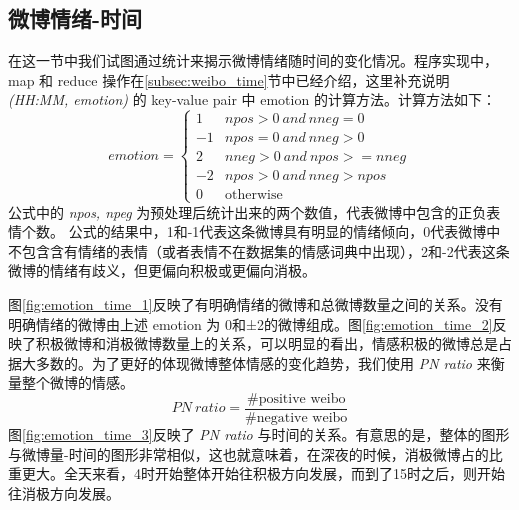 \documentclass[12pt, oneside]{article}
\begin{document}
\begin{spacing}{1.5}
\begin{CJK}{UTF8}{gbsn}
\subsection{微博情绪-时间}
\label{subsec:emotion_time}
在这一节中我们试图通过统计来揭示微博情绪随时间的变化情况。程序实现中， map 和 reduce 操作在\ref{subsec:weibo_time}节中已经介绍，这里补充说明 {\it(HH:MM, emotion)} 的 key-value pair 中 emotion 的计算方法。计算方法如下：
$$
emotion = 
\begin{cases}
1 & npos > 0~and~nneg = 0 \\
-1 & npos = 0~and~nneg > 0 \\
2 & nneg > 0~and~npos >= nneg \\
-2 & npos > 0~and~nneg > npos \\
0 & \text{otherwise}
\end{cases}
$$
公式中的 {\it npos, npeg} 为预处理后统计出来的两个数值，代表微博中包含的正负表情个数。 公式的结果中，1和-1代表这条微博具有明显的情绪倾向，0代表微博中不包含含有情绪的表情（或者表情不在数据集的情感词典中出现），2和-2代表这条微博的情绪有歧义，但更偏向积极或更偏向消极。

图\ref{fig:emotion_time_1}反映了有明确情绪的微博和总微博数量之间的关系。没有明确情绪的微博由上述 emotion 为 0和±2的微博组成。图\ref{fig:emotion_time_2}反映了积极微博和消极微博数量上的关系，可以明显的看出，情感积极的微博总是占据大多数的。为了更好的体现微博整体情感的变化趋势，我们使用 {\it PN ratio} 来衡量整个微博的情感。
$$PN~ratio = \frac{\text{\#positive weibo}}{\text{\#negative weibo}}$$
图\ref{fig:emotion_time_3}反映了 {\it PN ratio} 与时间的关系。有意思的是，整体的图形与微博量-时间的图形非常相似，这也就意味着，在深夜的时候，消极微博占的比重更大。全天来看，4时开始整体开始往积极方向发展，而到了15时之后，则开始往消极方向发展。


\end{CJK}
\end{spacing}
\end{document}
